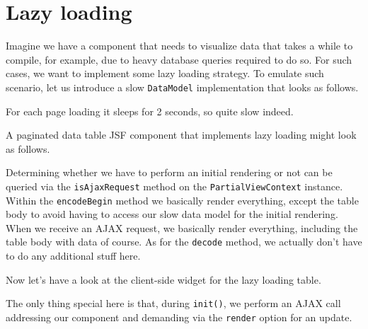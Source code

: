 \section{Lazy loading}
Imagine we have a component that needs to visualize data that takes a while to compile, for example, due to heavy database queries required to do so.
For such cases, we want to implement some lazy loading strategy.
To emulate such scenario, let us introduce a slow \texttt{DataModel} implementation that looks as follows.

For each page loading it sleeps for 2 seconds, so quite slow indeed.

A paginated data table JSF component that implements lazy loading might look as follows.

Determining whether we have to perform an initial rendering or not can be queried via the \texttt{isAjaxRequest} method on the \texttt{PartialViewContext} instance.
Within the \texttt{encodeBegin} method we basically render everything, except the table body to avoid having to access our slow data model for the initial rendering.
When we receive an AJAX request, we basically render everything, including the table body with data of course.
As for the \texttt{decode} method, we actually don't have to do any additional stuff here.

Now let's have a look at the client-side widget for the lazy loading table.

The only thing special here is that, during \texttt{init()}, we perform an AJAX call addressing our component and demanding via the \texttt{render} option for an update.

